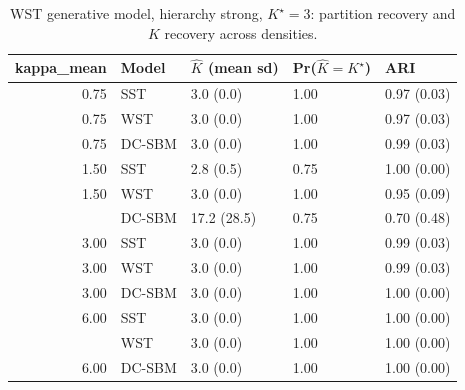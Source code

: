 \begin{table}
\centering
\caption{WST generative model, hierarchy strong, $K^\star=3$: partition recovery and $K$ recovery across densities.}
\centering
\begin{tabular}[t]{rllll}
\toprule
kappa_mean & Model & $\hat K$ (mean sd) & Pr($\hat K = K^\star$) & ARI\\
\midrule
0.75 & SST & 3.0 (0.0) & 1.00 & 0.97 (0.03)\\
0.75 & WST & 3.0 (0.0) & 1.00 & 0.97 (0.03)\\
0.75 & DC-SBM & 3.0 (0.0) & 1.00 & 0.99 (0.03)\\
1.50 & SST & 2.8 (0.5) & 0.75 & 1.00 (0.00)\\
1.50 & WST & 3.0 (0.0) & 1.00 & 0.95 (0.09)\\
\addlinespace
1.50 & DC-SBM & 17.2 (28.5) & 0.75 & 0.70 (0.48)\\
3.00 & SST & 3.0 (0.0) & 1.00 & 0.99 (0.03)\\
3.00 & WST & 3.0 (0.0) & 1.00 & 0.99 (0.03)\\
3.00 & DC-SBM & 3.0 (0.0) & 1.00 & 1.00 (0.00)\\
6.00 & SST & 3.0 (0.0) & 1.00 & 1.00 (0.00)\\
\addlinespace
6.00 & WST & 3.0 (0.0) & 1.00 & 1.00 (0.00)\\
6.00 & DC-SBM & 3.0 (0.0) & 1.00 & 1.00 (0.00)\\
\bottomrule
\end{tabular}
\end{table}

